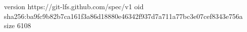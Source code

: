version https://git-lfs.github.com/spec/v1
oid sha256:ba9fc9b82b7ca161f3a86d18880e46342f937d7a711a77bc3e07cef8343e756a
size 6108
